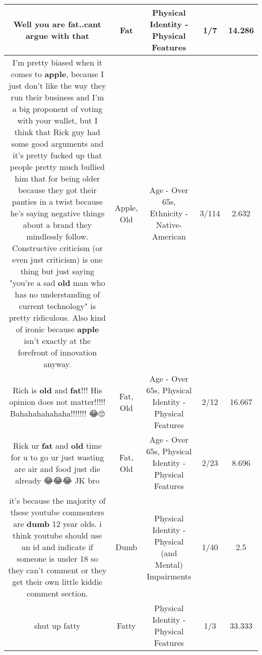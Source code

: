 \documentclass[11pt]{article}
\newlength\mylength
\begin{document}
\begin{center}
\begin{longtable}{|C{.65\mylength}|C{.30\mylength}|C{.12\mylength}|C{.12\mylength}|C{.12\mylength}|}
  \small Well you are \textbf{fat}..cant argue with that\normalsize   & Fat & Physical Identity - Physical Features & 1/7 & 14.286 \\  \hline
  \small I'm pretty biased when it comes to \textbf{apple}, because I just don't like the way they run their business and I'm a big proponent of voting with your wallet, but I think that Rick guy had some good arguments and it's pretty fucked up that people pretty much bullied him that for being older because they got their panties in a twist because he's saying negative things about a brand they mindlessly follow. Constructive criticism (or even just criticism) is one thing but just saying "you're a sad \textbf{old} man who has no understanding of current technology" is pretty ridiculous. Also kind of ironic because \textbf{apple} isn't exactly at the forefront of innovation anyway.\normalsize   & Apple, Old & Age - Over 65s, Ethnicity - Native-American & 3/114 & 2.632 \\  \hline
  \small Rich is \textbf{old} and \textbf{fat}!!! His opinion does not matter!!!!! Bahahahahahaha!!!!!!! 😂🙄\normalsize   & Fat, Old & Age - Over 65s, Physical Identity - Physical Features & 2/12 & 16.667 \\  \hline
  \small Rick ur \textbf{fat} and \textbf{old} time for u to go ur just wasting are air and food just die already 😂😂😂 JK bro\normalsize   & Fat, Old & Age - Over 65s, Physical Identity - Physical Features & 2/23 & 8.696 \\  \hline
  \small it's because the majority of these youtube commenters are \textbf{dumb} 12 year olds. i think youtube should use an id and indicate if someone is under 18 so they can't comment or they get their own little kiddie comment section.\normalsize   & Dumb & Physical Identity - Physical (and Mental) Impairments & 1/40 & 2.5 \\  \hline
  \small shut up fatty\normalsize   & Fatty & Physical Identity - Physical Features & 1/3 & 33.333 \\  \hline

\end{longtable}
\end{center}
\end{document}
